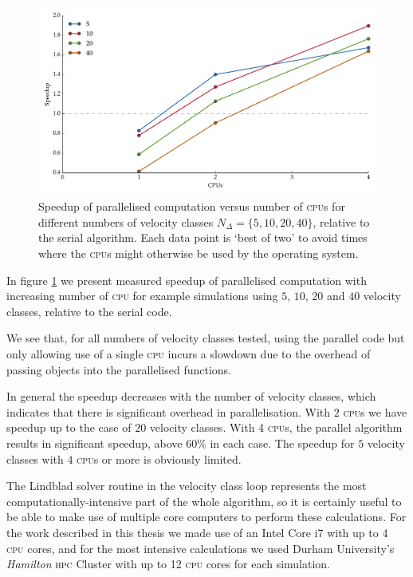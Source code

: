     \begin{figure}[]
      \includegraphics[width=\linewidth]{figs/10_appendices/speedup_cpus.pdf}
      \caption{
      Speedup of parallelised computation versus number of \textsc{cpu}s for
      different numbers of velocity classes $N_\Delta = \{ 5, 10, 20, 40 \}$,
      relative to the serial algorithm. Each data point is `best of two' to
      avoid times where the \textsc{cpu}s might otherwise be used by the
      operating system.
      }
      \label{fig:parallel_delta} 
    \end{figure}

    In figure \ref{fig:parallel_delta} we present measured speedup of
    parallelised computation with increasing number of \textsc{cpu} for example
    simulations using $5$, $10$, $20$ and $40$ velocity classes, relative to the
    serial code.

    We see that, for all numbers of velocity classes tested, using the parallel
    code but only allowing use of a single \textsc{cpu} incurs a slowdown due
    to the overhead of passing objects into the parallelised functions.

    In general the speedup decreases with the number of velocity classes, which
    indicates that there is significant overhead in parallelisation. With $2$
    \textsc{cpu}s we have speedup up to the case of $20$ velocity classes. With
    4 \textsc{cpu}s, the parallel algorithm results in significant speedup,
    above $60\%$ in each case. The speedup for $5$ velocity classes with $4$
    \textsc{cpu}s or more is obviously limited.

    The Lindblad solver routine in the velocity class loop represents the most
    computationally-intensive part of the whole algorithm, so it is certainly
    useful to be able to make use of multiple core computers to perform these
    calculations. For the work described in this thesis we made use of an Intel
    Core i7 with up to 4 \textsc{cpu} cores, and for the most intensive
    calculations we used Durham University's \textit{Hamilton} \textsc{hpc}
    Cluster with up to 12 \textsc{cpu} cores for each simulation.

